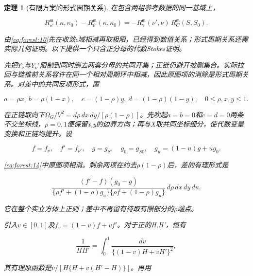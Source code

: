 \documentclass[11pt,a4paper,oneside]{ctexart}
\theoremstyle{cnplain}
\newtheorem{theorem}{定理}[section]
\theoremstyle{definition}
\theoremstyle{remark}
\numberwithin{equation}{section}
\begin{document}
\begin{theorem}[有限方案的形式周期关系]

\label{thm:forest:6.1} 在包含两组参考数据的同一基域上，

\begin{equation}
R_{\nu'}^{\mathfrak m}(\kappa,\kappa_0)
     -R_\nu^{\mathfrak m}(\kappa,\kappa_0)
       =-R_\gamma^{\mathfrak m}(\nu',\nu)\,
                         R_C^{\mathfrak m}(S,S_0).              \label{eq:forest:20}
\end{equation}

由\eqref{eq:forest:10}先在收敛\(\epsilon \)域相减再取极限，已经得到数值关系；形式周期关系还需实际几何证明。以下提供一个只含正分母的代数Stokes证明。

先把\(Y_\nu \)与\(Y_\nu '\)限制到同时删去两套分母的共同开集；正链仍避开被删集合。实际拉回与链推前关系容许在同一个相对周期环中相减，因此原图项的消除是形式周期关系。对差中的共同反项形式，置

\begin{equation}
a=\rho x,\ b=\rho(1-x),\quad
 c=(1-\rho)y,\ d=(1-\rho)(1-y),\quad 0\le\rho,x,y\le1.
\end{equation}

在正链取向下\(\Omega _G/V^{2}=d\rho \,dx\,dy/[\rho (1- \rho )]\)。先吹起\({a=b=0}\)和\({c=d=0}\)两条不交坐标线，\(\rho =0,1\)便保留x,y的边界方向；再与X取共同坐标细分，使代数变量变换和正链均提升。设

\begin{equation}
f=f_\nu,\quad f'=f_{\nu'},\quad g=g_S,\quad g_0=g_{S0},
 \quad g_u=(1-u)g+ug_0.
\end{equation}

\eqref{eq:forest:14}中原图项相消。剩余两项在约去\(\rho (1- \rho )\)后，差的有理形式是

\begin{equation}
\frac{(f'-f)(g_0-g)}
  {\{\rho f'+(1-\rho)g_u\}\{\rho f+(1-\rho)g_u\}}\,
                                 d\rho\,dx\,dy\,du.             \label{eq:forest:21}
\end{equation}

它在整个实立方体上正则；差中不再留有待取有限部分的\(\rho \)端点。

引入\(v\in [0,1]\)及\(f_v=(1- v)f+vf'\)。对于正的H,H'，恒有

\begin{equation}
\frac1{HH'}=\int_0^1\frac{dv}{\{(1-v)H+vH'\}^2},              \label{eq:forest:22}
\end{equation}

其有理原函数是\(v/[H\{H+v(H'- H)\}]\)。再用


\end{theorem}
\end{document}
